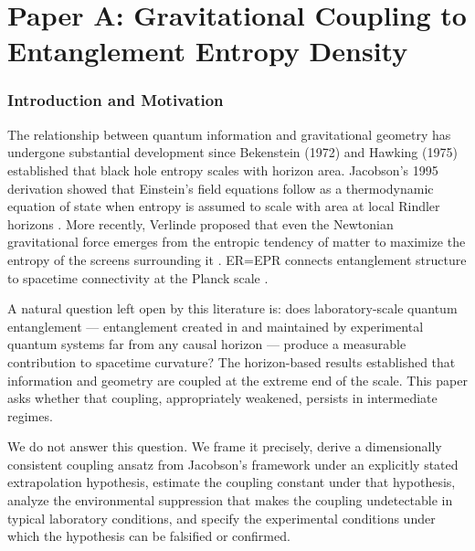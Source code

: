 \documentclass[12pt,letterpaper]{article}
\theoremstyle{plain}
\theoremstyle{definition}
\theoremstyle{remark}
\begin{document}
\part*{Paper A: Gravitational Coupling to Entanglement Entropy Density}

\section{Introduction and Motivation}
\label{sec:intro_A}

The relationship between quantum information and gravitational geometry
has undergone substantial development since Bekenstein (1972) and
Hawking (1975) established that black hole entropy scales with horizon
area. Jacobson's 1995 derivation showed that Einstein's field equations
follow as a thermodynamic equation of state when entropy is assumed to
scale with area at local Rindler horizons \cite{jacobson1995}. More
recently, Verlinde proposed that even the Newtonian gravitational force
emerges from the entropic tendency of matter to maximize the entropy of
the screens surrounding it \cite{verlinde2017}. ER=EPR connects
entanglement structure to spacetime connectivity at the Planck scale
\cite{maldacena2013}.

A natural question left open by this literature is: does laboratory-scale
quantum entanglement --- entanglement created in and maintained by
experimental quantum systems far from any causal horizon --- produce a
measurable contribution to spacetime curvature? The horizon-based results
established that information and geometry are coupled at the extreme end
of the scale. This paper asks whether that coupling, appropriately
weakened, persists in intermediate regimes.

We do not answer this question. We frame it precisely, derive a
dimensionally consistent coupling ansatz from Jacobson's framework under
an explicitly stated extrapolation hypothesis, estimate the coupling
constant under that hypothesis, analyze the environmental suppression
that makes the coupling undetectable in typical laboratory conditions,
and specify the experimental conditions under which the hypothesis can
be falsified or confirmed.
\end{document}
